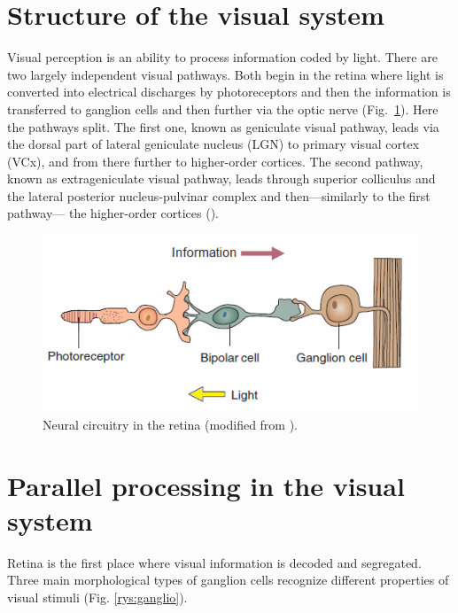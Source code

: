 \documentclass{pracalicmgr}
\begin{document}
   \section{Structure of the visual system}
   Visual perception is an ability to process information coded by light. There are two largely independent visual pathways. Both begin in the retina where light is converted into electrical discharges by photoreceptors and then the information is transferred to ganglion cells and then further via the optic nerve (Fig.~\ref{rys:neural_circuitry}). Here the pathways split. The first one, known as geniculate visual pathway, leads via the dorsal part of lateral geniculate nucleus (LGN) to primary visual cortex (VCx), and from there further to higher-order cortices. The second pathway, known as extrageniculate visual pathway, leads through superior colliculus and the lateral posterior nucleus-pulvinar complex and then---similarly to the first pathway--- the higher-order cortices (\cite{viola, thomsonlayer6}). 
   \begin{figure}[htbp]
   	\begin{center}
   		\includegraphics[scale=0.9]{neural_circuitry.png}
   	\end{center}
   	\caption{Neural circuitry in the retina (modified from \cite{carlsonphysiology}).}
   	\label{rys:neural_circuitry}
   \end{figure}      
   
   \section{Parallel processing in the visual system}
   Retina is the first place where visual information is decoded and segregated. Three main morphological types of ganglion cells recognize different properties of visual stimuli (Fig. \ref{rys:ganglio}).
   
\end{document}
